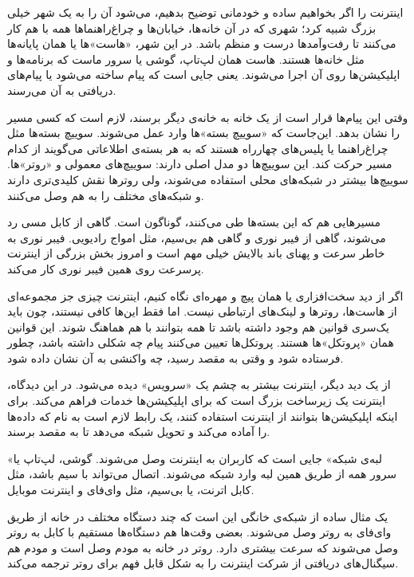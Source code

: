 

اینترنت را اگر بخواهیم ساده و خودمانی توضیح بدهیم، می‌شود آن را به یک شهر خیلی بزرگ شبیه کرد؛ شهری که در آن خانه‌ها، خیابان‌ها و چراغ‌راهنماها همه با هم کار می‌کنند تا رفت‌وآمدها درست و منظم باشد. در این شهر، «هاست»ها یا همان پایانه‌ها مثل خانه‌ها هستند. هاست همان لپ‌تاپ، گوشی یا سرور ماست که برنامه‌ها و اپلیکیشن‌ها روی آن اجرا می‌شوند. یعنی جایی است که پیام ساخته می‌شود یا پیام‌های دریافتی به آن می‌رسند.  

وقتی این پیام‌ها قرار است از یک خانه به خانه‌ی دیگر برسند، لازم است که کسی مسیر را نشان بدهد. این‌جاست که «سوییچ بسته»‌ها وارد عمل می‌شوند. سوییچ بسته‌ها مثل چراغ‌راهنما یا پلیس‌های چهارراه هستند که به هر بسته‌ی اطلاعاتی می‌گویند از کدام مسیر حرکت کند. این سوییچ‌ها دو مدل اصلی دارند: سوییچ‌های معمولی و «روتر»ها. سوییچ‌ها بیشتر در شبکه‌های محلی استفاده می‌شوند، ولی روترها نقش کلیدی‌تری دارند و شبکه‌های مختلف را به هم وصل می‌کنند.  

مسیرهایی هم که این بسته‌ها طی می‌کنند، گوناگون است. گاهی از کابل مسی رد می‌شوند، گاهی از فیبر نوری و گاهی هم بی‌سیم، مثل امواج رادیویی. فیبر نوری به خاطر سرعت و پهنای باند بالایش خیلی مهم است و امروز بخش بزرگی از اینترنت پرسرعت روی همین فیبر نوری کار می‌کند.  

اگر از دید سخت‌افزاری یا همان پیچ و مهره‌ای نگاه کنیم، اینترنت چیزی جز مجموعه‌ای از هاست‌ها، روترها و لینک‌های ارتباطی نیست. اما فقط این‌ها کافی نیستند، چون باید یک‌سری قوانین هم وجود داشته باشد تا همه بتوانند با هم هماهنگ شوند. این قوانین همان «پروتکل»ها هستند. پروتکل‌ها تعیین می‌کنند پیام چه شکلی داشته باشد، چطور فرستاده شود و وقتی به مقصد رسید، چه واکنشی به آن نشان داده شود.  

از یک دید دیگر، اینترنت بیشتر به چشم یک «سرویس» دیده می‌شود. در این دیدگاه، اینترنت یک زیرساخت بزرگ است که برای اپلیکیشن‌ها خدمات فراهم می‌کند. برای اینکه اپلیکیشن‌ها بتوانند از اینترنت استفاده کنند، یک رابط لازم است به نام  که داده‌ها را آماده می‌کند و تحویل شبکه می‌دهد تا به مقصد برسند.  

«لبه‌ی شبکه» جایی است که کاربران به اینترنت وصل می‌شوند. گوشی، لپ‌تاپ یا سرور همه از طریق همین لبه وارد شبکه می‌شوند. اتصال می‌تواند با سیم باشد، مثل کابل اترنت، یا بی‌سیم، مثل وای‌فای و اینترنت موبایل.  

یک مثال ساده از شبکه‌ی خانگی این است که چند دستگاه مختلف در خانه از طریق وای‌فای به روتر وصل می‌شوند. بعضی وقت‌ها هم دستگاه‌ها مستقیم با کابل به روتر وصل می‌شوند که سرعت بیشتری دارد. روتر در خانه به مودم وصل است و مودم هم سیگنال‌های دریافتی از شرکت اینترنت را به شکل قابل فهم برای روتر ترجمه می‌کند.  


